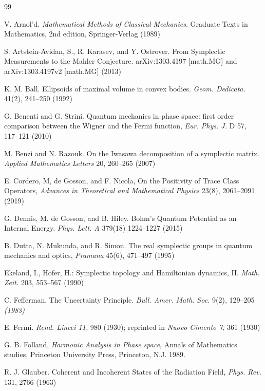 \documentclass[11pt]{article}%
\begin{document}
\begin{thebibliography}{99}                                                                                               %


V. Arnol'd. \textit{Mathematical Methods of Classical
Mechanics}. Graduate Texts in Mathematics, 2nd edition, Springer-Verlag (1989)

S. Artstein-Avidan, S., R. Karasev, and Y. Ostrover. From
Symplectic Measurements to the Mahler Conjecture. arXiv:1303.4197 [math.MG]
and arXiv:1303.4197v2 [math.MG] (2013)

K. M. Ball. Ellipsoids of maximal volume in convex bodies.
\textit{Geom. Dedicata.} 41(2), 241--250 (1992)\textit{ }

G. Benenti and G. Strini. Quantum mechanics in phase space:
first order comparison between the Wigner and the Fermi function, \textit{Eur.
Phys. J.} D 57, 117--121 (2010)

M. Benzi and N. Razouk. On the Iwasawa decomposition of a
symplectic matrix.\textit{ Applied Mathematics Letters} 20, 260--265 (2007)

E. Cordero, M, de Gosson, and F. Nicola, On the Positivity of
Trace Class Operators, \textit{Advances in Theoretical and Mathematical
Physics} 23(8), 2061--2091 (2019)

G. Dennis, M. de Gosson, and B. Hiley. Bohm's Quantum
Potential as an Internal Energy. \textit{Phys. Lett. A} 379(18) 1224--1227 (2015)

B. Dutta, N. Mukunda, and R. Simon. The real symplectic groups
in quantum mechanics and optics, \textit{Pramana} 45(6), 471--497 (1995)

Ekeland, I., Hofer, H.: Symplectic topology and Hamiltonian
dynamics, II. \textit{Math. Zeit.} 203, 553--567 (1990)

C. Fefferman. The Uncertainty Principle. \textit{Bull.
Amer. Math. Soc. }9(2), 129--205\textit{ (1983)}

E. Fermi. \textit{Rend. Lincei 11, }980 (1930); reprinted in
\textit{Nuovo Cimento 7}, 361 (1930)

G. B. Folland, \textit{Harmonic Analysis in Phase space},
Annals of Mathematics studies, Princeton University Press, Princeton, N.J. 1989.

R. J. Glauber. Coherent and Incoherent States of the Radiation
Field, \textit{Phys. Rev.} 131, 2766 (1963)


\end{thebibliography}
\end{document}
